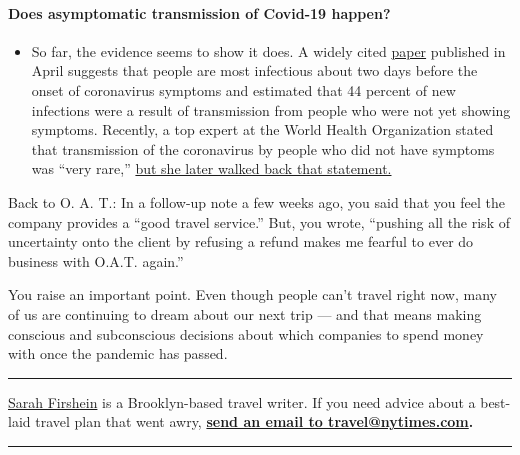 \begin{itemize}
{  \paragraph{Does asymptomatic transmission of Covid-19
  happen?}\label{does-asymptomatic-transmission-of-covid-19-happen}}

  \begin{itemize}
  \tightlist
  \item
    So far, the evidence seems to show it does. A widely cited
    \href{https://www.nature.com/articles/s41591-020-0869-5}{paper}
    published in April suggests that people are most infectious about
    two days before the onset of coronavirus symptoms and estimated that
    44 percent of new infections were a result of transmission from
    people who were not yet showing symptoms. Recently, a top expert at
    the World Health Organization stated that transmission of the
    coronavirus by people who did not have symptoms was ``very rare,''
    \href{https://www.nytimes.com/2020/06/09/world/coronavirus-updates.html?action=click\&pgtype=Article\&state=default\&region=MAIN_CONTENT_3\&context=storylines_faq\#link-1f302e21}{but
    she later walked back that statement.}
  \end{itemize}
\end{itemize}

Back to O. A. T.: In a follow-up note a few weeks ago, you said that you
feel the company provides a ``good travel service.'' But, you wrote,
``pushing all the risk of uncertainty onto the client by refusing a
refund makes me fearful to ever do business with O.A.T. again.''

You raise an important point. Even though people can't travel right now,
many of us are continuing to dream about our next trip --- and that
means making conscious and subconscious decisions about which companies
to spend money with once the pandemic has passed.

\begin{center}\rule{0.5\linewidth}{\linethickness}\end{center}

\href{https://twitter.com/sfirshein?lang=en}{Sarah Firshein} is a
Brooklyn-based travel writer. If you need advice about a best-laid
travel plan that went awry,
\textbf{\href{mailto:travel@nytimes.com}{send an email to
travel@nytimes.com}.}

\begin{center}\rule{0.5\linewidth}{\linethickness}\end{center}

